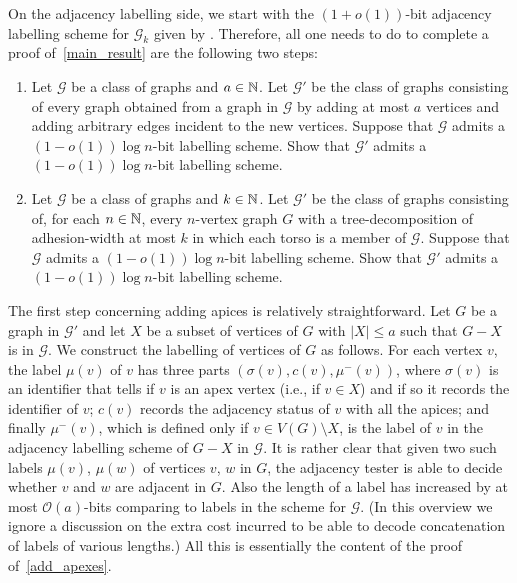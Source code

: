 \documentclass{patmorin}
\renewcommand{\leq}{\leqslant}
\newcommand{\Oh}{\mathcal{O}}
\begin{document}
On the adjacency labelling side, we start with
the $(1+o(1))$-bit adjacency labelling scheme for $\mathcal{G}_k$ given by
\citet{dujmovic.esperet.ea:adjacency}.
Therefore, all one needs to do to complete a proof of~\cref{main_result}
are the following two steps:
\begin{enumerate}[label=\rm(\arabic*)]
\item Let $\mathcal{G}$ be a class of graphs and $a\in\mathbb{N}$.
    Let $\mathcal{G}'$ be the class of graphs consisting of
    every graph obtained from a graph in $\mathcal{G}$
    by adding at most $a$ vertices and
    adding arbitrary edges incident to the new vertices.
    Suppose that $\mathcal{G}$ admits a $(1-o(1))\log n$-bit labelling scheme.
    Show that $\mathcal{G}'$ admits a $(1-o(1))\log n$-bit labelling scheme.
\item Let $\mathcal{G}$ be a class of graphs and $k\in\mathbb{N}$.
      Let $\mathcal{G}'$ be the class of graphs consisting of, for each $n\in\mathbb{N}$, every $n$-vertex graph $G$ with a tree-decomposition of adhesion-width at most $k$ in which each torso is a member of $\mathcal{G}$.
      Suppose that $\mathcal{G}$ admits a $(1-o(1))\log n$-bit labelling scheme.
      Show that $\mathcal{G}'$ admits a $(1-o(1))\log n$-bit labelling scheme.
\end{enumerate}

The first step concerning adding apices is relatively straightforward.
Let $G$ be a graph in $\mathcal{G}'$ and
let $X$ be a subset of vertices of $G$ with $|X|\leq a$ such that $G-X$ is in $\mathcal{G}$.
We construct the labelling of vertices of $G$ as follows.
For each vertex $v$,
the label $\mu(v)$ of $v$ has three parts $(\sigma(v),c(v),\mu^-(v))$,
where $\sigma(v)$ is an identifier that tells if $v$ is an apex vertex (i.e., if $v\in X$) and if so it records the identifier of $v$;
$c(v)$ records the adjacency status of $v$ with all the apices; and
finally $\mu^-(v)$, which is defined only if $v\in V(G)\setminus X$, is the label of $v$ in the adjacency labelling scheme of $G-X$ in $\mathcal{G}$.
It is rather clear that given two such labels $\mu(v)$, $\mu(w)$ of vertices $v$, $w$ in $G$, the adjacency tester is able to decide whether $v$ and $w$ are adjacent in $G$.
Also the length of a label has increased by at most $\Oh(a)$-bits comparing to labels in the scheme for $\mathcal{G}$.
(In this overview we ignore a discussion on the extra cost incurred to be able to decode concatenation of labels of various lengths.)
All this is essentially the content of the proof of~\cref{add_apexes}.
\end{document}
